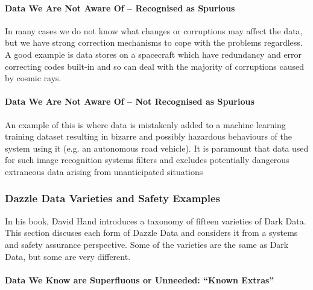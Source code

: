 \paragraph{Data We Are Not Aware Of -- Recognised as Spurious}
In many cases we do not know what changes or corruptions may affect the data, but we have strong correction mechanisms to cope with the problems regardless. A good example is data stores on a spacecraft which have redundancy and error correcting codes built-in and so can deal with the majority of corruptions caused by cosmic rays.

\paragraph{Data We Are Not Aware Of -- Not Recognised as Spurious}
An example of this is where data is mistakenly added to a machine learning training \gls{dataset} resulting in bizarre and possibly hazardous behaviours of the system using it (e.g. an autonomous road vehicle). It is paramount that data used for such image recognition systems filters and excludes potentially dangerous extraneous data arising from unanticipated situations 

\subsubsection{Dazzle Data Varieties and Safety Examples}
In his book, David Hand introduces a taxonomy of fifteen varieties of Dark Data. This section discuses each form of Dazzle Data and considers it from a systems and safety assurance perspective.
Some of the varieties are the same as Dark Data, but some are very different.

\paragraph{Data We Know are Superfluous or Unneeded: ``Known Extras''}
\label{bkm:dazzledata:case1}

